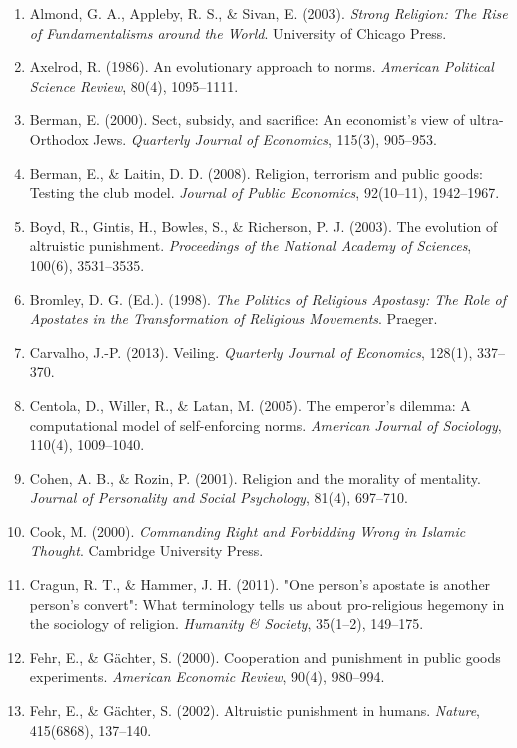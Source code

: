 \documentclass[12pt]{article}
\begin{document}
\begin{enumerate}
\def\labelenumi{\arabic{enumi}.}
\item
  Almond, G. A., Appleby, R. S., \& Sivan, E. (2003). \emph{Strong Religion: The Rise of Fundamentalisms around the World}. University of Chicago Press.
\item
  Axelrod, R. (1986). An evolutionary approach to norms. \emph{American Political Science Review}, 80(4), 1095--1111.
\item
  Berman, E. (2000). Sect, subsidy, and sacrifice: An economist's view of ultra-Orthodox Jews. \emph{Quarterly Journal of Economics}, 115(3), 905--953.
\item
  Berman, E., \& Laitin, D. D. (2008). Religion, terrorism and public goods: Testing the club model. \emph{Journal of Public Economics}, 92(10--11), 1942--1967.
\item
  Boyd, R., Gintis, H., Bowles, S., \& Richerson, P. J. (2003). The evolution of altruistic punishment. \emph{Proceedings of the National Academy of Sciences}, 100(6), 3531--3535.
\item
  Bromley, D. G. (Ed.). (1998). \emph{The Politics of Religious Apostasy: The Role of Apostates in the Transformation of Religious Movements}. Praeger.
\item
  Carvalho, J.-P. (2013). Veiling. \emph{Quarterly Journal of Economics}, 128(1), 337--370.
\item
  Centola, D., Willer, R., \& Latan, M. (2005). The emperor's dilemma: A computational model of self-enforcing norms. \emph{American Journal of Sociology}, 110(4), 1009--1040.
\item
  Cohen, A. B., \& Rozin, P. (2001). Religion and the morality of mentality. \emph{Journal of Personality and Social Psychology}, 81(4), 697--710.
\item
  Cook, M. (2000). \emph{Commanding Right and Forbidding Wrong in Islamic Thought}. Cambridge University Press.
\item
  Cragun, R. T., \& Hammer, J. H. (2011). "One person's apostate is another person's convert": What terminology tells us about pro-religious hegemony in the sociology of religion. \emph{Humanity \& Society}, 35(1--2), 149--175.
\item
  Fehr, E., \& Gächter, S. (2000). Cooperation and punishment in public goods experiments. \emph{American Economic Review}, 90(4), 980--994.
\item
  Fehr, E., \& Gächter, S. (2002). Altruistic punishment in humans. \emph{Nature}, 415(6868), 137--140.

\end{enumerate}
\end{document}
